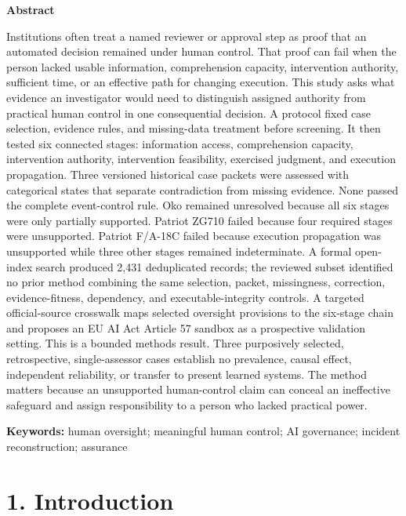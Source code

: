 \documentclass[11pt]{article}
\begin{document}
\vspace{0.35em}
\begin{TAEAbstractBox}
{\small\textbf{Abstract}\par\medskip}
\small
Institutions often treat a named reviewer or approval step as proof that an automated decision remained under human control. That proof can fail when the person lacked usable information, comprehension capacity, intervention authority, sufficient time, or an effective path for changing execution. This study asks what evidence an investigator would need to distinguish assigned authority from practical human control in one consequential decision. A protocol fixed case selection, evidence rules, and missing-data treatment before screening. It then tested six connected stages: information access, comprehension capacity, intervention authority, intervention feasibility, exercised judgment, and execution propagation. Three versioned historical case packets were assessed with categorical states that separate contradiction from missing evidence. None passed the complete event-control rule. Oko remained unresolved because all six stages were only partially supported. Patriot ZG710 failed because four required stages were unsupported. Patriot F/A-18C failed because execution propagation was unsupported while three other stages remained indeterminate. A formal open-index search produced 2,431 deduplicated records; the reviewed subset identified no prior method combining the same selection, packet, missingness, correction, evidence-fitness, dependency, and executable-integrity controls. A targeted official-source crosswalk maps selected oversight provisions to the six-stage chain and proposes an EU AI Act Article 57 sandbox as a prospective validation setting. This is a bounded methods result. Three purposively selected, retrospective, single-assessor cases establish no prevalence, causal effect, independent reliability, or transfer to present learned systems. The method matters because an unsupported human-control claim can conceal an ineffective safeguard and assign responsibility to a person who lacked practical power.
\small
\par\medskip\noindent\textbf{Keywords:} human oversight; meaningful human control; AI governance; incident reconstruction; assurance
\end{TAEAbstractBox}
\FloatBarrier

\section*{1. Introduction}
\end{document}
